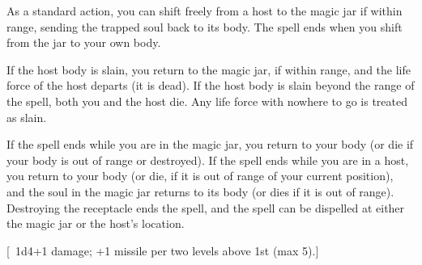 {As a standard action, you can shift freely from a host to the magic jar if within range, sending the trapped soul back to its body. The spell ends when you shift from the jar to your own body.

If the host body is slain, you return to the magic jar, if within range, and the life force of the host departs (it is dead). If the host body is slain beyond the range of the spell, both you and the host die. Any life force with nowhere to go is treated as slain.

If the spell ends while you are in the magic jar, you return to your body (or die if your body is out of range or destroyed). If the spell ends while you are in a host, you return to your body (or die, if it is out of range of your current position), and the soul in the magic jar returns to its body (or dies if it is out of range). Destroying the receptacle ends the spell, and the spell can be dispelled at either the magic jar or the host's location.}
        
[ 1d4+1 damage; +1 missile per two levels above 1st (max 5).]
        
